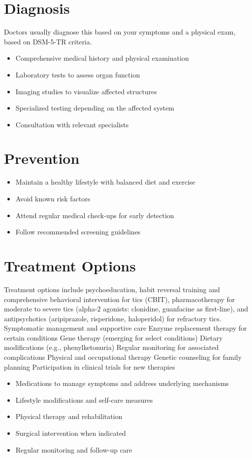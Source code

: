 \section{Diagnosis}
Doctors usually diagnose this based on your symptoms and a physical exam, based on DSM-5-TR criteria.

\begin{itemize}[noitemsep]
  \item Comprehensive medical history and physical examination
  \item Laboratory tests to assess organ function
  \item Imaging studies to visualize affected structures
  \item Specialized testing depending on the affected system
  \item Consultation with relevant specialists
\end{itemize}
\section{Prevention}
\begin{itemize}[noitemsep]
  \item Maintain a healthy lifestyle with balanced diet and exercise
  \item Avoid known risk factors
  \item Attend regular medical check-ups for early detection
  \item Follow recommended screening guidelines
\end{itemize}
\section{Treatment Options}
Treatment options include psychoeducation, habit reversal training and comprehensive behavioral intervention for tics (CBIT), pharmacotherapy for moderate to severe tics (alpha-2 agonists: clonidine, guanfacine as first-line), and antipsychotics (aripiprazole, risperidone, haloperidol) for refractory tics. Symptomatic management and supportive care Enzyme replacement therapy for certain conditions Gene therapy (emerging for select conditions) Dietary modifications (e.g., phenylketonuria) Regular monitoring for associated complications Physical and occupational therapy Genetic counseling for family planning Participation in clinical trials for new therapies

\begin{itemize}[noitemsep]
  \item Medications to manage symptoms and address underlying mechanisms
  \item Lifestyle modifications and self-care measures
  \item Physical therapy and rehabilitation
  \item Surgical intervention when indicated
  \item Regular monitoring and follow-up care
\end{itemize}
